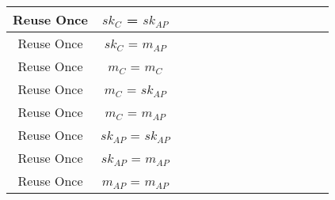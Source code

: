 \documentclass[crop]{standalone}
\newcommand{\noattack}{\color{ForestGreen}\usym{2713}\color{black}}
\begin{document}
{\begin{tabular}{|c|c|c|c|c|c|c|c|c|c|c|c|c|c|}
Reuse Once & $sk_C$ = $sk_{AP}$ & \noattack & \noattack & \noattack & \noattack & \noattack & \noattack & \noattack & \noattack & \noattack & \noattack & \noattack & \noattack\\ \hline
Reuse Once & $sk_C$ = $m_{AP}$ & \noattack & \noattack & \noattack & \noattack & \noattack & \noattack & \noattack & \noattack & \noattack & \noattack & \noattack & \noattack\\ \hline
Reuse Once & $m_C$ = $m_C$ & \noattack & \noattack & \noattack & \noattack & \noattack & \noattack & \noattack & \noattack & \noattack & \noattack & \noattack & \noattack\\ \hline
Reuse Once & $m_C$ = $sk_{AP}$ & \noattack & \noattack & \noattack & \noattack & \noattack & \noattack & \noattack & \noattack & \noattack & \noattack & \noattack & \noattack\\ \hline
Reuse Once & $m_C$ = $m_{AP}$ & \noattack & \noattack & \noattack & \noattack & \noattack & \noattack & \noattack & \noattack & \noattack & \noattack & \noattack & \noattack\\ \hline
Reuse Once & $sk_{AP}$ = $sk_{AP}$ & \noattack & \noattack & \noattack & \noattack & \noattack & \noattack & \noattack & \noattack & \noattack & \noattack & \noattack & \noattack\\ \hline
Reuse Once & $sk_{AP}$ = $m_{AP}$ & \noattack & \noattack & \noattack & \noattack & \noattack & \noattack & \noattack & \noattack & \noattack & \noattack & \noattack & \noattack\\ \hline
Reuse Once & $m_{AP}$ = $m_{AP}$ & \noattack & \noattack & \noattack & \noattack & \noattack & \noattack & \noattack & \noattack & \noattack & \noattack & \noattack & \noattack\\ \hline
\end{tabular}}
\end{document}
